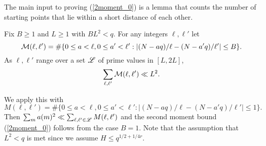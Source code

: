 \documentclass[oneside,11pt]{amsart}
\begin{document}
The main input to proving (\ref{2moment_0}) is a lemma that counts the number of starting points that lie within a short distance of each other.
\begin{lemma}\label{lemma_M}
Fix $B \geq 1$ and $L \geq 1$ with $BL^2 < q$. For any integers $\ell, \ell' $ let
\[ \mathcal{M}(\ell,\ell') = \# \{ 0 \leq a < \ell, 0 \leq a' < \ell': |(N-aq)/\ell - (N-a'q)/\ell'| \leq B\}.\]
As $\ell,\ell'$ range over a set $\mathscr{L}$ of prime values in $[L,2L]$,
\[ \sum_{\ell, \ell' } \mathcal{M}(\ell,\ell') \ll L^2.\]
\end{lemma}

We apply this with 
\[ M(\ell,\ell') = \# \{ 0 \leq a < \ell, 0 \leq a' < \ell': |(N-aq)/\ell - (N-a'q)/\ell'| \leq 1\}.\]
Then $ \sum_m a(m)^2 \ll  \sum_{\ell ,\ell' \in \mathscr{L}} M(\ell,\ell')$
and the second moment bound (\ref{2moment_0}) follows from the case $B=1$. Note that the assumption that $L^2< q$ is met since we assume $H \leq q^{1/2+1/4r}$.
 
\end{document}
